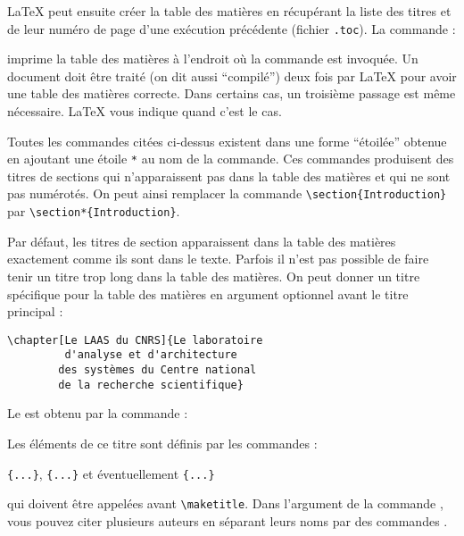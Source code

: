 \LaTeX{} peut ensuite créer la table des matières en récupérant la
liste des titres et de leur numéro de page d'une exécution précédente
(fichier \texttt{.toc}). La commande :
\begin{lscommand}
\end{lscommand}
\noindent imprime la table des matières à l'endroit où la commande est
invoquée. Un document doit être traité (on dit aussi \enquote{compilé})
deux fois par \LaTeX{} pour avoir une table des matières
correcte. Dans certains cas, un troisième passage est même
nécessaire. \LaTeX{} vous indique quand c'est le cas.

Toutes les commandes citées ci-dessus existent dans une forme
\enquote{étoilée} obtenue en ajoutant une étoile \verb|*| au nom de la
commande. Ces commandes produisent des titres de sections qui
n'apparaissent pas dans la table des matières et qui ne sont pas
numérotés. On peut ainsi remplacer la commande
\verb|\section{Introduction}| par
\verb|\section*{Introduction}|.

Par défaut, les titres de section apparaissent dans la table des
matières exactement comme ils sont dans le texte. Parfois il n'est pas
possible de faire tenir un titre trop long dans la table des
matières. On peut donner un titre spécifique pour la table des
matières en argument optionnel avant le titre principal :
\begin{code}
\verb|\chapter[Le LAAS du CNRS]{Le laboratoire|\\
\verb|         d'analyse et d'architecture|\\
\verb|        des systèmes du Centre national|\\
\verb|        de la recherche scientifique}|
\end{code}

Le  est obtenu par la commande :
\begin{lscommand}
\end{lscommand}
Les éléments de ce titre sont définis par les commandes :
\begin{lscommand}
\verb|{...}|, \verb|{...}|
et éventuellement \verb|{...}|
\end{lscommand}
\noindent qui doivent être appelées avant \verb|\maketitle|. Dans
l'argument de la commande , vous pouvez citer plusieurs
auteurs en séparant leurs noms par des commandes .

